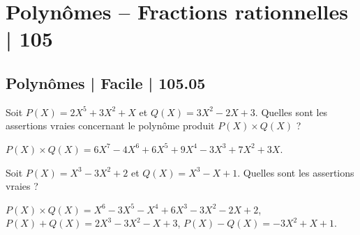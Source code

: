 




\section{Polynômes -- Fractions rationnelles | 105}


\subsection{Polynômes | Facile | 105.05}

\begin{question}
Soit $P(X) = 2X^5+3X^2+X$ et $Q(X) = 3X^2-2X+3$.
Quelles sont les assertions vraies concernant le polynôme produit $P(X)\times Q(X)$ ?
\begin{answers}



\end{answers}

\begin{explanations}
$P(X)\times Q(X) = 6 X^7 - 4 X^6 + 6 X^5 + 9 X^4 - 3 X^3 + 7 X^2 + 3 X$.
\end{explanations}
\end{question}


\begin{question}
Soit $P(X) = X^3-3X^2+2$ et $Q(X) = X^3-X+1$.
Quelles sont les assertions vraies ?
\begin{answers}


    
\end{answers}
\begin{explanations}
$P(X)\times Q(X) = X^6 - 3 X^5 - X^4 + 6 X^3 - 3 X^2 - 2 X + 2$, 
$P(X) + Q(X) = 2 X^3 - 3 X^2 - X + 3$,
$P(X) - Q(X) = -3 X^2 + X + 1$.
\end{explanations}
\end{question}


